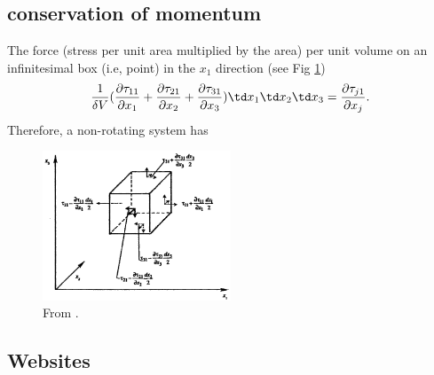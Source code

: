 \subsection{conservation of momentum}
\begin{defn*}
The force (stress per unit area multiplied by the area) per unit volume on an infinitesimal box
(i.e, point) in the $x_1$ direction (see Fig \ref{fig:stress})
%
\begin{equation}
   \frac{1}{\delta V}( \frac{\partial \tau_{11}}{\partial x_1} +  
   \frac{\partial \tau_{21}}{\partial x_2} +
   \frac{\partial \tau_{31}}{\partial x_3} )\td x_1 \td x_2 \td x_3 = 
   \frac{\partial \tau_{j1}}{\partial x_j}.
\end{equation}
%
Therefore, a non-rotating system has  
%
\begin{figure}[H] 
   \includegraphics[width=0.5\textwidth,height=0.4\textwidth]{stress.png} 
   \caption{\label{fig:stress} From \cite{kundu2008fluid}.  } 
\end{figure}
%
\end{defn*}




























\subsection{Websites}



